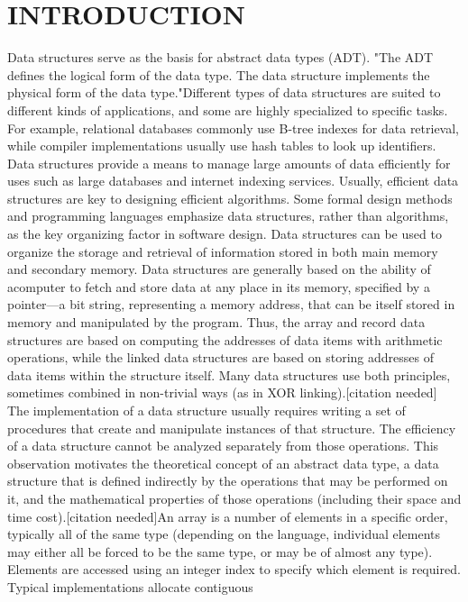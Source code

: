 \documentclass{article}
\begin{document}
\section{INTRODUCTION}
Data structures serve as the basis for abstract data
types (ADT). "The ADT defines the logical form of
the data type. The data structure implements the
physical form of the data type."Different types of data
structures are suited to different kinds of applications,
and some are highly specialized to specific tasks. For
example, relational databases commonly use B-tree
indexes for data retrieval, while compiler
implementations usually use hash tables to look up
identifiers. Data structures provide a means to manage
large amounts of data efficiently for uses such as large
databases and internet indexing services. Usually,
efficient data structures are key to designing efficient
algorithms. Some formal design methods and
programming languages emphasize data structures,
rather than algorithms, as the key organizing factor in
software design. Data structures can be used to
organize the storage and retrieval of information
stored in both main memory and secondary memory.
Data structures are generally based on the ability of acomputer to fetch and store data at any place in its
memory, specified by a pointer—a bit string,
representing a memory address, that can be itself
stored in memory and manipulated by the program.
Thus, the array and record data structures are based on
computing the addresses of data items with arithmetic
operations, while the linked data structures are based
on storing addresses of data items within the structure
itself. Many data structures use both principles,
sometimes combined in non-trivial ways (as in XOR
linking).[citation needed] \\
The implementation of a data structure usually
requires writing a set of procedures that create and
manipulate instances of that structure. The efficiency
of a data structure cannot be analyzed separately from
those operations. This observation motivates the
theoretical concept of an abstract data type, a data
structure that is defined indirectly by the operations
that may be performed on it, and the mathematical
properties of those operations (including their space
and time cost).[citation needed]An array is a number
of elements in a specific order, typically all of the
same type (depending on the language, individual
elements may either all be forced to be the same type,
or may be of almost any type). Elements are accessed
using an integer index to specify which element is
required. Typical implementations allocate contiguous
\end{document}
